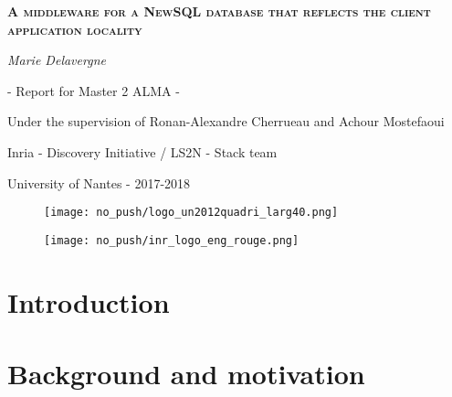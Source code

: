 \documentclass[a4paper, 10pt, titlepage]{report}
\begin{document}
%
\begin{titlepage}
	\centering
	{\scshape\LARGE\bfseries A middleware for a NewSQL database that reflects the client application locality \par}
	\vspace{0cm}
	{\Large\itshape Marie Delavergne\par}
        {\Large - Report for Master 2 ALMA -\par}

	\vfill


        {\large Under the supervision of Ronan-Alexandre Cherrueau and Achour Mostefaoui \par}
        {\large Inria - Discovery Initiative / LS2N - Stack team\par}
	{\large University of Nantes - 2017-2018 \par}

\begin{figure}[!h]\centering
   \begin{minipage}{0.3\textwidth}
     \centerline{\texttt{[image: no\_push/logo\_un2012quadri\_larg40.png]}}
     \label{Fig:univnantes}
   \end{minipage}
   \begin {minipage}{0.3\textwidth}
     \centerline{\texttt{[image: no\_push/inr\_logo\_eng\_rouge.png]}}
     \label{Fig:inria}
   \end{minipage}
\end{figure}



\end{titlepage}


\clearpage
\tableofcontents
\newpage

\section*{Introduction}

\section{Background and motivation}



\end{document}
